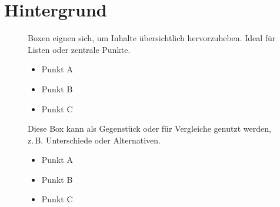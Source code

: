 
\chapter{Hintergrund}

\begin{figure}[htbp] %
\vspace{0.4cm}
\begin{tcbraster}[raster columns=2, 
raster equal height, %
raster column skip=5mm]
\begin{tcolorbox}[title=\textbf{Box A}, colback=white, arc=3mm, boxrule=1.5pt]
Boxen eignen sich, um Inhalte übersichtlich hervorzuheben. Ideal für Listen oder zentrale Punkte.
\begin{itemize}
\item Punkt A
\item Punkt B
\item Punkt C
\end{itemize}
\end{tcolorbox}
\begin{tcolorbox}[title=\textbf{Box B}, colback=white, arc=3mm, boxrule=1.5pt]
Diese Box kann als Gegenstück oder für Vergleiche genutzt werden, z.\,B. Unterschiede oder Alternativen.
\begin{itemize}
\item Punkt A
\item Punkt B
\item Punkt C
\end{itemize}
\end{tcolorbox}
\end{tcbraster}
\end{figure}
